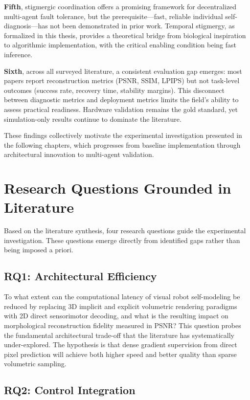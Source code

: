 \documentclass[12pt,a4paper,oneside]{report}
\begin{document}
\textbf{Fifth}, stigmergic coordination offers a promising framework for decentralized multi-agent fault tolerance, but the prerequisite—fast, reliable individual self-diagnosis—has not been demonstrated in prior work. Temporal stigmergy, as formalized in this thesis, provides a theoretical bridge from biological inspiration to algorithmic implementation, with the critical enabling condition being fast inference.

\textbf{Sixth}, across all surveyed literature, a consistent evaluation gap emerges: most papers report reconstruction metrics (PSNR, SSIM, LPIPS) but not task-level outcomes (success rate, recovery time, stability margins). This disconnect between diagnostic metrics and deployment metrics limits the field's ability to assess practical readiness. Hardware validation remains the gold standard, yet simulation-only results continue to dominate the literature.

These findings collectively motivate the experimental investigation presented in the following chapters, which progresses from baseline implementation through architectural innovation to multi-agent validation.

\section{Research Questions Grounded in Literature}

Based on the literature synthesis, four research questions guide the experimental investigation. These questions emerge directly from identified gaps rather than being imposed a priori.

\subsection{RQ1: Architectural Efficiency}
\label{subsec:rq1_architectural_efficiency}

To what extent can the computational latency of visual robot self-modeling be reduced by replacing 3D implicit and explicit volumetric rendering paradigms with 2D direct sensorimotor decoding, and what is the resulting impact on morphological reconstruction fidelity measured in PSNR? This question probes the fundamental architectural trade-off that the literature has systematically under-explored. The hypothesis is that dense gradient supervision from direct pixel prediction will achieve both higher speed and better quality than sparse volumetric sampling.

\subsection{RQ2: Control Integration}
\label{subsec:rq2_control_integration}
\end{document}
